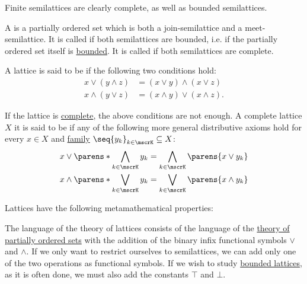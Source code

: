 \begin{definition}
\begin{thmenum}[series=def:semilattice]
    Finite semilattices are clearly complete, as well as bounded semilattices.

     A  is a partially ordered set which is both a join-semilattice and a meet-semilattice. It is called  if both semilattices are bounded, i.e. if the partially ordered set itself is \hyperref[def:partially_ordered_set_extremal_points/top_and_bottom]{bounded}. It is called  if both semilattices are complete.

     A lattice is said to be  if the following two conditions hold:
    \begin{align}
      x \vee (y \wedge z) &= (x \vee y) \wedge (x \vee z) \label{eq:def:semilattice/distributive_lattice/finite/join_over_meet} \\
      x \wedge (y \vee z) &= (x \wedge y) \vee (x \wedge z) \label{eq:def:semilattice/distributive_lattice/finite/meet_over_join}.
    \end{align}

    If the lattice is \hyperref[def:semilattice/complete]{complete}, the above conditions are not enough. A complete lattice \( X \) it is said to be  if any of the following more general distributive axioms hold for every \( x \in X \) and \hyperref[def:cartesian_product/indexed_family]{family} \( \seq{ y_k }_{k \in \mscrK} \subseteq X \):
    \begin{align}
      x \vee \parens*{ \bigwedge_{k \in \mscrK} y_k } &= \bigwedge_{k \in \mscrK} \parens{ x \vee y_k } \label{eq:def:semilattice/distributive_lattice/arbitrary/join_over_meet} \\
      x \wedge \parens*{ \bigvee_{k \in \mscrK} y_k } &= \bigvee_{k \in \mscrK} \parens{ x \wedge y_k } \label{eq:def:semilattice/distributive_lattice/arbitrary/meet_over_join}
    \end{align}
  \end{thmenum}

  Lattices have the following metamathematical properties:
  \begin{thmenum}[resume=def:semilattice]
     The language of the theory of lattices consists of the language of the \hyperref[def:partially_ordered_set/theory]{theory of partially ordered sets} with the addition of the binary infix functional symbols \( \vee \) and \( \wedge \). If we only want to restrict ourselves to semilattices, we can add only one of the two operations as functional symbols. If we wish to study \hyperref[def:semilattice/bounded]{bounded lattices}, as it is often done, we must also add the constants \( \top \) and \( \bot \).


\end{thmenum}
\end{definition}
